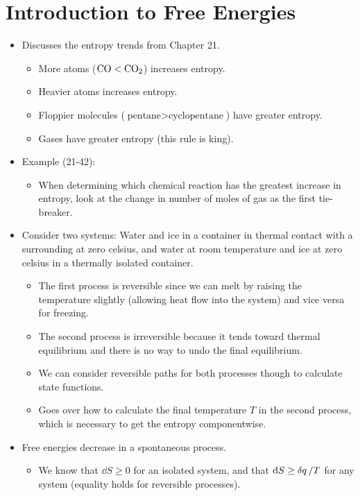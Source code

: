 \documentclass[../notes.tex]{subfiles}
\begin{document}
\section{Introduction to Free Energies}
\begin{itemize}
    \item {}Discusses the entropy trends from Chapter 21.
    \begin{itemize}
        \item More atoms ($\ce{CO}<\ce{CO2}$) increases entropy.
        \item Heavier atoms increases entropy.
        \item Floppier molecules ($\text{pentane}>\text{cyclopentane}$) have greater entropy.
        \item Gases have greater entropy (this rule is king).
    \end{itemize}
    \item Example (21-42):
    \begin{itemize}
        \item When determining which chemical reaction has the greatest increase in entropy, look at the change in number of moles of gas as the first tie-breaker.
    \end{itemize}
    \item Consider two systems: Water and ice in a container in thermal contact with a surrounding at zero celsius, and water at room temperature and ice at zero celsius in a thermally isolated container.
    \begin{itemize}
        \item The first process is reversible since we can melt by raising the temperature slightly (allowing heat flow into the system) and vice versa for freezing.
        \item The second process is irreversible because it tends toward thermal equilibrium and there is no way to undo the final equilibrium.
        \item We can consider reversible paths for both processes though to calculate state functions.
        \item Goes over how to calculate the final temperature $T$ in the second process, which is necessary to get the entropy componentwise.
    \end{itemize}
    \item Free energies decrease in a spontaneous process.
    \begin{itemize}
        \item We know that $\dd{S}\geq 0$ for an isolated system, and that $\dd{S}\geq\var{q}/T$ for any system (equality holds for reversible processes).

\end{itemize}
\end{itemize}
\end{document}
